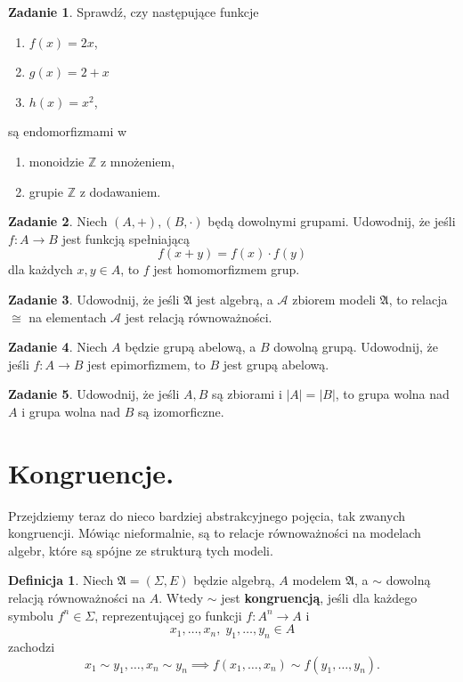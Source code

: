 \documentclass{book}
\theoremstyle{definition}
\newtheorem{definition}{Definicja}[section]
\newtheorem{exercise}{Zadanie}[section]
\begin{document}
\begin{exercise}
	Sprawdź, czy następujące funkcje
	\begin{enumerate}
		\item $f(x) = 2x$,
		\item $g(x) = 2 + x$
		\item $h(x) = x^2$,
	\end{enumerate}
	są endomorfizmami w
	\begin{enumerate}
		\item monoidzie $\mathbb{Z}$ z mnożeniem,
		\item grupie $\mathbb{Z}$ z dodawaniem.
	\end{enumerate}
\end{exercise}

\begin{exercise}
	Niech $(A, +), (B, \cdot)$ będą dowolnymi grupami.
	Udowodnij,
		że jeśli $f: A \to B$ jest funkcją spełniającą
	\begin{equation}
		f(x + y) = f(x) \cdot f(y)
	\end{equation}
	dla każdych $x, y \in A$, to $f$ jest homomorfizmem grup.
\end{exercise}

\begin{exercise}
	Udowodnij,
		że jeśli $\mathfrak{A}$ jest algebrą,
		a $\mathcal{A}$ zbiorem modeli $\mathfrak{A}$,
		to relacja $\cong$ na elementach $\mathcal{A}$ jest relacją równoważności.
\end{exercise}

\begin{exercise}
	Niech $A$ będzie grupą abelową, a $B$ dowolną grupą.
	Udowodnij, że jeśli $f: A \to B$ jest epimorfizmem,
		to $B$ jest grupą abelową.
\end{exercise}

\begin{exercise}
	Udowodnij, że jeśli $A, B$ są zbiorami i $|A| = |B|$,
		to grupa wolna nad $A$ i grupa wolna nad $B$ są izomorficzne.
\end{exercise}

\section{Kongruencje.}
Przejdziemy teraz do nieco bardziej abstrakcyjnego pojęcia,
	tak zwanych kongruencji.
Mówiąc nieformalnie,
	są to relacje równoważności na modelach algebr,
	które są spójne ze strukturą tych modeli.

\begin{definition}
	Niech $\mathfrak{A} = (\Sigma, E)$ będzie algebrą,
		$A$ modelem $\mathfrak{A}$,
		a $\sim$ dowolną relacją równoważności na $A$.
	Wtedy $\sim$ jest \textbf{kongruencją},
		jeśli dla każdego symbolu $f^n \in \Sigma$,
			reprezentującej go funkcji $f: A^n \to A$ i
	\begin{equation}
		x_1, \dots, x_n,\; y_1, \dots, y_n \in A
	\end{equation}
	 zachodzi
	\begin{equation}
		x_1 \sim y_1, \dots, x_n \sim y_n \implies f(x_1, \dots, x_n) \sim f(y_1, \dots, y_n).
	\end{equation}
\end{definition}
\end{document}
